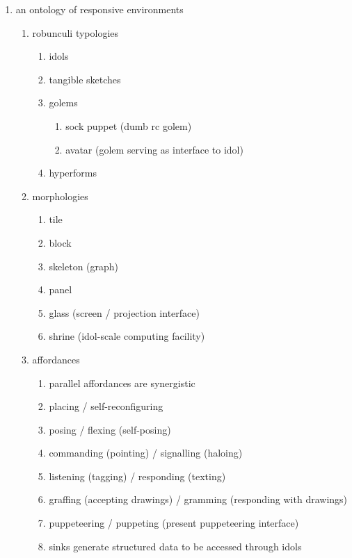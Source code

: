 \begin{enumerate}
    \item an ontology of responsive environments
    \begin{enumerate}
        \item robunculi typologies
        \begin{enumerate}
            \item idols
            \item tangible sketches
            \item golems
            \begin{enumerate}
                \item sock puppet (dumb rc golem)
                \item avatar (golem serving as interface to idol)
            \end{enumerate}
            \item hyperforms
        \end{enumerate}
        \item morphologies
        \begin{enumerate}
            \item tile
            \item block
            \item skeleton (graph)
            \item panel
            \item glass (screen / projection interface)
            \item shrine (idol-scale computing facility)
        \end{enumerate}
        \item affordances
        \begin{enumerate}
            \item parallel affordances are synergistic
            \item placing / self-reconfiguring
            \item posing / flexing (self-posing)
            \item commanding (pointing) / signalling (haloing)
            \item listening (tagging) / responding (texting)
            \item graffing (accepting drawings) / gramming (responding with drawings)
            \item puppeteering / puppeting (present puppeteering interface)
            \item sinks generate structured data to be accessed through idols

\end{enumerate}
\end{enumerate}
\end{enumerate}
